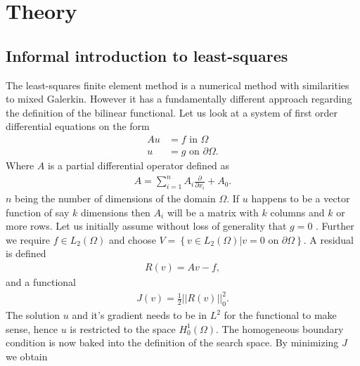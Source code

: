 
\chapter{Theory} %

\label{chap:theory} %



\section{Informal introduction to least-squares}
The least-squares finite element method is a numerical method with similarities to mixed Galerkin. However it has a fundamentally different approach regarding the definition of the bilinear functional. Let us look at a system of first order differential equations on the form 
\begin{align}
	Au &= f \text{ in } \Omega \\
	u &= g \text{ on } \partial \Omega.
	\label{eq:PDE}
\end{align}
Where $A$ is a partial differential operator defined as 
\begin{align}
	A = \sum_{i = 1}^{n} A_i\frac{\partial}{\partial x_i} + A_0.
	\label{def:operatorA}
\end{align}
	$n$ being the number of dimensions of the domain $\Omega$. If $u$ happens to be a vector function of say $k$ dimensions then $A_i$ will be a matrix with $k$ columns and $k$ or more rows. Let us initially assume without loss of generality that $g=0$ . Further we require $f \in L_2(\Omega)$ and choose $V = \left\{ v\in L_2(\Omega) | v = 0 \text{ on } \partial \Omega \right\}$. A residual is defined
\begin{align}
	R(v) = Av-f,
	\label{eq:Residual}
\end{align}
and a functional
\begin{align}
	 J(v) = \frac{1}{2}||R(v)||^2_0.
	\label{eq:Functional}
\end{align} 
The solution $u$ and it's gradient needs to be in $L^2$ for the functional to make sense, hence $u$ is restricted to the space $H^1_0(\Omega)$. The homogeneous boundary condition is now baked into the definition of the search space. By minimizing $J$ we obtain 
